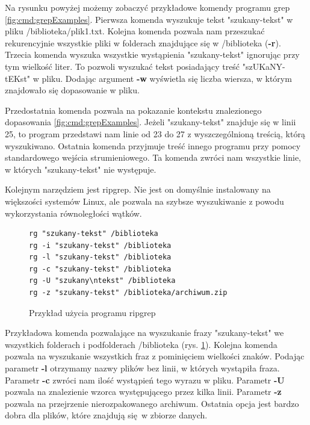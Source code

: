 Na rysunku powyżej możemy zobaczyć przykładowe komendy programu grep 
\ref{fig:cmd:grepExamples}. Pierwsza komenda wyszukuje tekst "szukany-tekst" w pliku /biblioteka/plik1.txt.
Kolejna komenda pozwala nam przeszukać rekurencyjnie wszystkie pliki w folderach znajdujące się w 
/biblioteka (\textbf{-r}). Trzecia komenda wyszuka wszystkie wystąpienia 
"szukany-tekst" ignorując przy tym wielkość liter. To pozwoli wyszukać tekst
posiadający treść "szUKaNY-tEKst" w pliku. Dodając argument \textbf{-w}
wyświetla się liczba wiersza, w którym znajdowało się dopasowanie w pliku. 

Przedostatnia komenda pozwala na pokazanie kontekstu znalezionego dopasowania 
\ref{fig:cmd:grepExamples}. Jeżeli "szukany-tekst" znajduje się w linii 25, to
program przedstawi nam linie od 23 do 27 z wyszczególnioną treścią, którą 
wyszukiwano. Ostatnia komenda przyjmuje treść innego programu przy pomocy
standardowego wejścia strumieniowego. Ta komenda zwróci nam wszystkie linie,
w których "szukany-tekst" nie występuje.

Kolejnym narzędziem jest ripgrep. Nie jest on domyślnie instalowany na 
większości systemów Linux, ale pozwala na szybsze wyszukiwanie z powodu
wykorzystania równoległości wątków.

\begin{figure}[h]
  \centering
\begin{tcolorbox}[
    colback=white,
    colframe=black,
    boxrule=0.5pt,
    arc=0pt
]
  \begin{verbatim}
rg "szukany-tekst" /biblioteka
rg -i "szukany-tekst" /biblioteka
rg -l "szukany-tekst" /biblioteka
rg -c "szukany-tekst" /biblioteka
rg -U "szukany\ntekst" /biblioteka
rg -z "szukany-tekst" /biblioteka/archiwum.zip
  \end{verbatim}
\end{tcolorbox}
\caption{Przykład użycia programu ripgrep}
\label{fig:cmd:ripgrepExamples}
\end{figure}

Przykładowa komenda pozwalające na wyszukanie frazy "szukany-tekst" we wszystkich
folderach i podfolderach /biblioteka (rys. \ref{fig:cmd:ripgrepExamples}). Kolejna
komenda pozwala na wyszukanie wszystkich fraz z pominięciem wielkości znaków. 
Podając parametr \textbf{-l} otrzymamy nazwy plików bez linii, w których 
wystąpiła fraza. Parametr \textbf{-c} zwróci nam ilość wystąpień tego wyrazu w 
pliku. Parametr \textbf{-U} pozwala na znalezienie wzorca występującego przez 
kilka linii. Parametr \textbf{-z} pozwala na przejrzenie nierozpakowanego 
archiwum. Ostatnia opcja jest bardzo dobra dla plików, które znajdują się w 
zbiorze danych.

